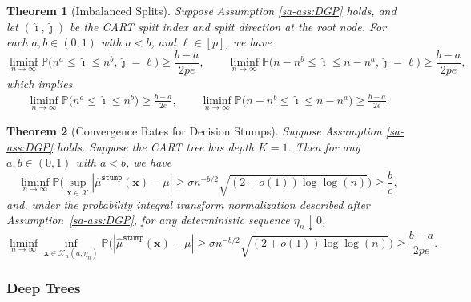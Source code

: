 \documentclass[10pt]{article}
\def\bx{\mathbf{x}}
\def\mustump{\hat{\mu}^{\mathtt{stump}}}
\newtheorem{theorem}{Theorem}%
\theoremstyle{definition}
\theoremstyle{remark}
\begin{document}
\begin{theorem}[Imbalanced Splits]\label{sa-thm:master}
   Suppose Assumption \ref{sa-ass:DGP} holds, and let $(\hat{\imath}, \hat{\jmath})$ be the CART split index and split direction at the root node.
    For each $ a,b \in (0, 1) $ with $ a < b $, and $\ell \in [p]$, we have
    \begin{equation} \label{eq:split_range}
        \liminf_{n\to\infty} \mathbb{P}\big( n^{a} \leq \hat{\imath} \leq n^{b}, \hat{\jmath} = \ell \big) \geq \frac{b-a}{2pe},
        \qquad
        \liminf_{n\to\infty} \mathbb{P}\big( n-n^{b} \leq \hat{\imath} \leq n-n^{a}, \hat{\jmath} = \ell \big) \geq \frac{b-a}{2pe},
    \end{equation}
    which implies
    \begin{align*}
         \liminf_{n\to\infty} \mathbb{P}\big( n^{a} \leq \hat{\imath} \leq n^{b} \big) \geq \frac{b-a}{2 e},
         \qquad
         \liminf_{n\to\infty} \mathbb{P}\big( n-n^{b} \leq \hat{\imath} \leq n-n^{a} \big) \geq \frac{b-a}{2 e}.
    \end{align*}
\end{theorem}


\begin{theorem}[Convergence Rates for Decision Stumps]\label{sa-thm:rates}
    Suppose Assumption \ref{sa-ass:DGP} holds. Suppose the CART tree has depth $K = 1$. Then for any $a,b \in (0, 1)$ with $ a < b $, we have
    \begin{equation}\label{eq:master_rate_constant}
        \liminf_{n\to\infty} \mathbb{P}\Bigg(\sup_{\bx\in\mathcal{X}}|\mustump(\bx) - \mu| \geq \sigma n^{-b/2}\sqrt{(2+o(1))\log\log(n)}\Bigg) \geq \frac{b}{e},
    \end{equation}
    and, under the probability integral transform normalization described after Assumption~\ref{sa-ass:DGP}, for any deterministic sequence $\eta_n\downarrow0$,
    \begin{equation} \label{eq:master_rate_constant2}
        \liminf_{n\to\infty} \inf_{\bx\in \mathcal{X}_n(a,\eta_n)} \mathbb{P}\Big(|\mustump(\bx) - \mu| \geq \sigma n^{-b/2}\sqrt{(2+o(1))\log\log(n)}\Big) \geq \frac{b-a}{2 p e}.
    \end{equation}
\end{theorem}



\subsubsection*{Deep Trees}
\end{document}
